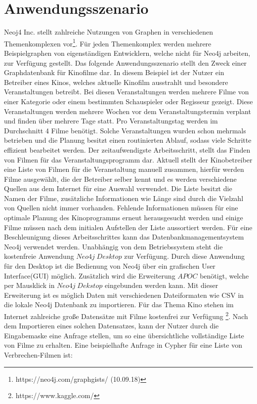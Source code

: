 \section{Anwendungsszenario}
Neoj4 Inc. stellt zahlreiche Nutzungen von Graphen in verschiedenen Themenkomplexen vor\footnote{https://neo4j.com/graphgists/ (10.09.18)}. Für jeden Themenkomplex werden mehrere Beispielgraphen von eigenständigen Entwicklern, welche nicht für Neo4j arbeiten, zur Verfügung gestellt. Das folgende Anwendungsszenario stellt den Zweck einer Graphdatenbank für Kinofilme dar.\newline
In diesem Beispiel ist der Nutzer ein Betreiber eines Kinos, welches aktuelle Kinofilm ausstrahlt und besondere Veranstaltungen betreibt. Bei diesen Veranstaltungen werden mehrere Filme von einer Kategorie oder einem bestimmten Schauspieler oder Regisseur gezeigt. Diese Veranstaltungen werden mehrere Wochen vor dem Veranstaltungstermin verplant und finden über mehrere Tage statt. Pro Veranstaltungstag werden im Durchschnitt 4 Filme benötigt. Solche Veranstaltungen wurden schon mehrmals betrieben und die Planung besitzt einen routinierten Ablauf, sodass viele Schritte effizient bearbeitet werden. Der zeitaufwendigste Arbeitsschritt, stellt das Finden von Filmen für das Veranstaltungsprogramm dar. \newline
Aktuell stellt der Kinobetreiber eine Liste von Filmen für die Veranstaltung manuell zusammen, hierfür werden Filme ausgewählt, die der Betreiber selber kennt und es werden verschiedene Quellen aus dem Internet für eine Auswahl verwendet. Die Liste besitzt die Namen der Filme, zusätzliche Informationen wie Länge sind durch die Vielzahl von Quellen nicht immer vorhanden. Fehlende Informationen müssen für eine optimale Planung des Kinoprogramms erneut herausgesucht werden und einige Filme müssen nach dem initialen Aufstellen der Liste  aussortiert werden. \newline  
Für eine Beschleunigung dieses Arbeitsschrittes kann das Datenbankmanagementsystem Neo4j verwendet werden. Unabhängig von dem Betriebssystem steht die kostenfreie Anwendung $Neo4j\; Desktop$ zur Verfügung. Durch diese Anwendung für den Desktop ist die Bedienung von Neo4j über ein grafischen User Interface(GUI) möglich. Zusätzlich wird die Erweiterung $APOC$ benötigt, welche per Mausklick in $Neo4j\; Dekstop$ eingebunden werden kann. Mit dieser Erweiterung ist es möglich Daten mit verschiedenen Dateiformaten wie CSV in die lokale Neo4j Datenbank zu importieren. Für das Thema Kino stehen im Internet zahlreiche große Datensätze mit Filme kostenfrei zur Verfügung \footnote{https://www.kaggle.com/}. Nach dem Importieren eines solchen Datensatzes, kann der Nutzer durch die Eingabemaske eine Anfrage stellen, um so eine übersichtliche vollständige Liste von Filme zu erhalten. Eine beispielhafte Anfrage in Cypher für eine Liste von Verbrechen-Filmen ist: 
